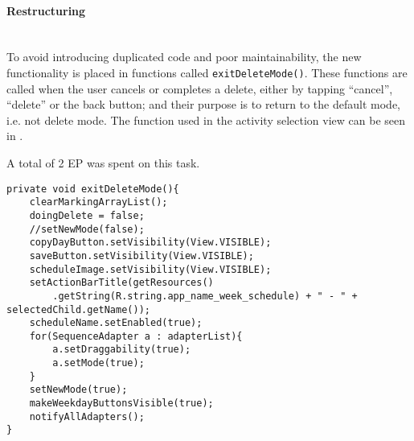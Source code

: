 \paragraph{Restructuring} \hfill\\
To avoid introducing duplicated code and poor maintainability, the new functionality is placed in functions called \texttt{exitDeleteMode()}.
These functions are called when the user cancels or completes a delete, either by tapping \enquote{cancel}, \enquote{delete} or the back button;
and their purpose is to return to the default mode, i.e. not delete mode.
The function used in the activity selection view can be seen in .

A total of 2 EP was spent on this task. 

\begin{lstlisting}[caption={The \texttt{exitDeleteMode()} function, which returns the application to the default mode}, label={lst:exitdeletemode}]
private void exitDeleteMode(){
    clearMarkingArrayList();
    doingDelete = false;
    //setNewMode(false);
    copyDayButton.setVisibility(View.VISIBLE);
    saveButton.setVisibility(View.VISIBLE);
    scheduleImage.setVisibility(View.VISIBLE);
    setActionBarTitle(getResources()
        .getString(R.string.app_name_week_schedule) + " - " + selectedChild.getName());
    scheduleName.setEnabled(true);
    for(SequenceAdapter a : adapterList){
        a.setDraggability(true);
        a.setMode(true);
    }
    setNewMode(true);
    makeWeekdayButtonsVisible(true);
    notifyAllAdapters();
}
\end{lstlisting}

